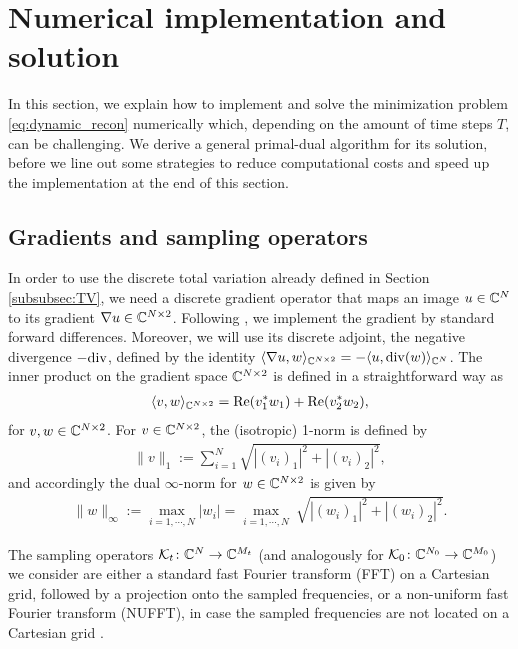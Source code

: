 \section{Numerical implementation and solution}
In this section, we explain how to implement and solve the minimization problem \eqref{eq:dynamic_recon} numerically which, depending on the amount of time steps $T$, can be challenging. 
We derive a general primal-dual algorithm for its solution, before we line out some strategies to reduce computational costs and speed up the implementation at the end of this section. 

\subsection{Gradients and sampling operators}
\label{subsec:implementation of operators}

In order to use the discrete total variation already defined in Section \ref{subsubsec:TV}, we need a discrete gradient operator that maps an image $u \in \mathbb{C}^N$ to its gradient $\nabla u \in \mathbb{C}^{N \times 2}$. 
Following \cite{ChambollePock}, we implement the gradient by standard forward differences. Moreover, we  will use its discrete adjoint, the negative divergence $-\mathrm{div}$, defined by the identity $\langle \nabla u, w \rangle_{\mathbb{C}^{N \times 2}} = - \langle u, \mathrm{div}(w) \rangle_{\mathbb{C}^N}$.
The inner product on the gradient space $\mathbb{C}^{N\times 2}$ is defined in a straightforward way as 
\begin{align*}
	\langle v,w \rangle_{\mathbb{C}^{N \times 2}} = \mathrm{Re}(v_1^* w_1) + \mathrm{Re}(v_2^* w_2),
\end{align*}
%
for $v,w \in \mathbb{C}^{N \times 2}$.
For $v \in \mathbb{C}^{N \times 2}$, the (isotropic) 1-norm is defined by 
\begin{align*}
	\|v \|_1 := \sum_{i=1}^N \sqrt{|(v_i)_1|^2 + |(v_i)_2|^2},
\end{align*}
and accordingly the dual $\infty$-norm for $w \in \mathbb{C}^{N \times 2}$ is given by 
\begin{align*}
	\| w \|_\infty := \max_{i=1,\cdots,N} |w_i| = \max_{i=1,\cdots,N} ~ \sqrt{|(w_i)_1|^2 + |(w_i)_2|^2}.
\end{align*}

The sampling operators $\mathcal{K}_t \colon \mathbb{C}^N \to \mathbb{C}^{M_t}$ (and analogously for $\mathcal{K}_0 \colon \mathbb{C}^{N_0} \to \mathbb{C}^{M_0}$) we consider are either a standard fast Fourier transform (FFT) on a Cartesian grid, followed by a projection onto the sampled frequencies, or a non-uniform fast Fourier transform (NUFFT), in case the sampled frequencies are not located on a Cartesian grid \cite{Fessler:NUFFT}. \\

